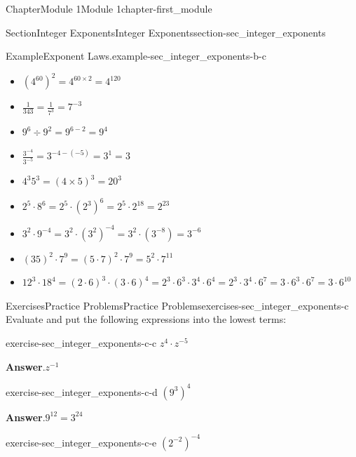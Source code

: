 \documentclass[oneside,10pt,]{book}
\newcommand{\blocktitlefont}{\relax}
\begin{document}
\begin{chapterptx}{Chapter}{Module 1}{}{Module 1}{}{}{chapter-first_module}
\begin{sectionptx}{Section}{Integer Exponents}{}{Integer Exponents}{}{}{section-sec_integer_exponents}
\begin{introduction}{}
\begin{example}{Example}{Exponent Laws.}{example-sec_integer_exponents-b-c}
\begin{itemize}[label=\textbullet]
\item{}\(\displaystyle (4^{60})^2 = 4^{60 \times 2} = 4^{120}\)%
\item{}\(\displaystyle \frac{1}{343} = \frac{1}{7^3} = 7^{-3}\)%
\item{}\(\displaystyle 9^6 \div 9^2 = 9^{6-2} = 9^{4}\)%
\item{}\(\displaystyle \frac{3^{-4}}{3^{-5}} = 3^{-4- (-5 )} = 3^1 = 3\)%
\item{}\(\displaystyle 4^3 5^3 =(4 \times 5)^3 = 20^{3}\)%
\item{}\(\displaystyle 2^5 \cdot 8^6 = 2^5 \cdot (2^3)^6 = 2^5 \cdot 2^{18} = 2^{23}\)%
\item{}\(\displaystyle 3^2 \cdot 9^{-4} = 3^2 \cdot (3^2)^{-4} = 3^2 \cdot (3^{-8}) = 3^{-6}\)%
\item{}\(\displaystyle (35)^2 \cdot 7^9 = (5\cdot 7)^2 \cdot 7^{9} = 5^2 \cdot 7^{11}\)%
\item{}\(\displaystyle 12^3 \cdot 18^4 = (2\cdot 6)^3 \cdot (3\cdot 6)^4 = 2^3\cdot 6^3\cdot 3^4 \cdot 6^4 = 2^3\cdot 3^4 \cdot 6^7 = 3\cdot 6^3\cdot 6^7= 3\cdot 6^{10}\)%
\end{itemize}
\end{example}
\end{introduction}%
%
%
\typeout{************************************************}
\typeout{************************************************}
%
\begin{exercises-subsection-numberless}{Exercises}{Practice Problems}{}{Practice Problems}{}{}{exercises-sec_integer_exponents-c}
Evaluate and put the following expressions into the lowest terms:%
\begin{divisionexercise}{1}{}{}{exercise-sec_integer_exponents-c-c}%
\(z^4 \cdot z^{-5}\)%
\par\smallskip%
\noindent\textbf{\blocktitlefont Answer}.\hypertarget{answer-sec_integer_exponents-c-c-b}{}\quad{}\(z^{-1}\)%
\end{divisionexercise}%
\begin{divisionexercise}{2}{}{}{exercise-sec_integer_exponents-c-d}%
\((9^3)^4\)%
\par\smallskip%
\noindent\textbf{\blocktitlefont Answer}.\hypertarget{answer-sec_integer_exponents-c-d-b}{}\quad{}\(9^{12}=3^{24}\)%
\end{divisionexercise}%
\begin{divisionexercise}{3}{}{}{exercise-sec_integer_exponents-c-e}%
\((2^{-2})^{-4}\)%
\par\smallskip%

\end{divisionexercise}
\end{exercises-subsection-numberless}
\end{sectionptx}
\end{chapterptx}
\end{document}
